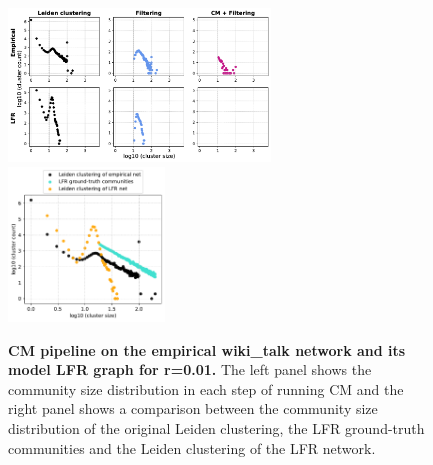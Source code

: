 \documentclass[11pt]{article}   	%
\begin{document}
\begin{figure}[h!]
\centering
\includegraphics[width=0.62\textwidth]{figs/wiki_talk_cm_steps_lfr01.pdf}
\includegraphics[width=0.37\textwidth]{figs/wiki_talk_01_cm_size.pdf}
\caption[CM pipeline on the Wikipedia talk network and its model LFR graph for r=0.01]{\textbf{CM pipeline on the empirical wiki\_talk network and its model LFR graph for r=0.01.} The left panel shows the community size distribution in each step of running CM and the right panel shows a comparison between the community size distribution of the original Leiden clustering, the LFR ground-truth communities and the Leiden clustering of the LFR network.}
\label{fig:wikitalk-cm-lfr-01}
\end{figure}
\end{document}
